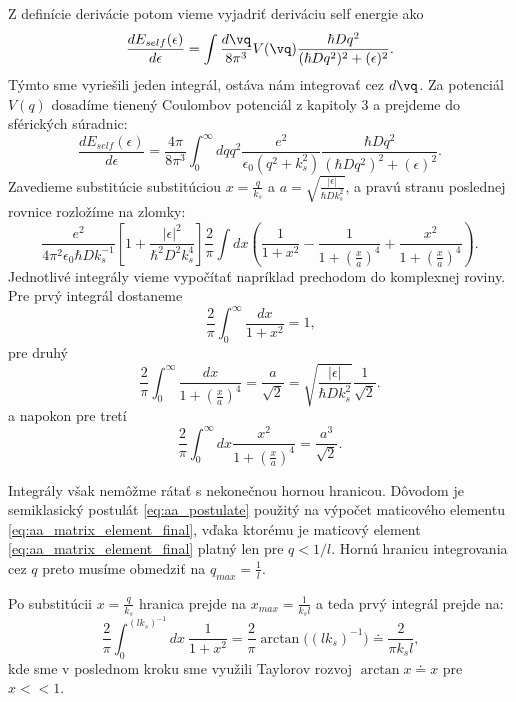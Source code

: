 Z definície derivácie potom vieme vyjadriť deriváciu self energie ako
\begin{equation}
 \label{eq:aa_selfenergy_der}
 \frac{dE_{self}(\epsilon)}{d\epsilon}=\int \frac{d\vq}{8\pi^3}V(\vq)\frac{\hbar D q^2}{(\hbar Dq^2)^2+(\epsilon)^2}\text{.}
\end{equation}
Týmto sme vyriešili jeden integrál, ostáva nám integrovať cez $d\vq$. Za potenciál $V(q)$ dosadíme tienený Coulombov potenciál
z kapitoly 3 a prejdeme do sférických súradnic:
\begin{equation}
 \frac{dE_{self}(\epsilon)}{d\epsilon}= \frac{4\pi}{8\pi^3} \int_0^\infty dq q^2 \frac{e^2}{\epsilon_0(q^2+k_s^2)}\frac{\hbar D q^2}{(\hbar Dq^2)^2+(\epsilon)^2} \text{.}
\end{equation}
Zavedieme substitúcie substitúciou $x=\frac{q}{k_s}$ a $a=\sqrt{\frac{|\epsilon|}{\hbar D k_s^2}}$, a pravú stranu poslednej rovnice rozložíme na zlomky:
\begin{equation}
\label{eq:aa_selfenergy_der_subst1}
\frac{e^2}{4\pi^2 \epsilon_0 \hbar D k_s^{-1}}[1+\frac{|\epsilon|^2}{\hbar^2D^2k_s^4}]\frac{2}{\pi}\int dx(\frac{1}{1+x^2}-
\frac{1}{1+(\frac{x}{a})^4}+\frac{x^2}{1+(\frac{x}{a})^4})\text{.}
\end{equation}
Jednotlivé integrály vieme vypočítať napríklad prechodom do komplexnej roviny.
Pre prvý integrál dostaneme
\begin{equation}
 \label{eq:aa_int1}
 \frac{2}{\pi}\int_0^{\infty}\frac{dx}{1+x^2}=1\text{,}
\end{equation}
pre druhý
\begin{equation}
 \label{eq:aa_int2}
 \frac{2}{\pi}\int_0^{\infty}\frac{dx}{1+(\frac{x}{a})^4}=\frac{a}{\sqrt{2}}=\sqrt{\frac{|\epsilon|}{\hbar D k_s^2}} \frac{1}{\sqrt{2}}\text{.}
\end{equation}
a napokon pre tretí
\begin{equation}
 \label{eq:aa_int3}
 \frac{2}{\pi}\int_0^{\infty}dx\frac{x^2}{1+(\frac{x}{a})^4}=\frac{a^3}{\sqrt{2}}\text{.}
\end{equation}

Integrály však nemôžme rátať s nekonečnou hornou hranicou. Dôvodom je semiklasický postulát \eqref{eq:aa_postulate}
použitý na výpočet maticového elementu \eqref{eq:aa_matrix_element_final}, vďaka ktorému je maticový element \eqref{eq:aa_matrix_element_final} platný len pre $q < 1/l$. 
Hornú hranicu integrovania cez $q$ preto musíme obmedziť
na $q_{max}=\frac{1}{l}$.

Po substitúcii $x=\frac{q}{k_s}$ hranica prejde na  $x_{max}=\frac{1}{k_sl}$ a teda prvý integrál prejde na:
\begin{equation}
 \label{eq:aa_int1_capped}
 \frac{2}{\pi}\int_0^{(l k_s)^{-1}}dx \ \frac{1}{1+x^2}= \frac{2}{\pi}\arctan\bigl((lk_s)^{-1}\bigr)\doteq \frac{2}{\pi k_s l}\text{,}
\end{equation}
kde sme v poslednom kroku sme využili Taylorov rozvoj $\arctan{x}\doteq x$ pre  $x<<1$.


